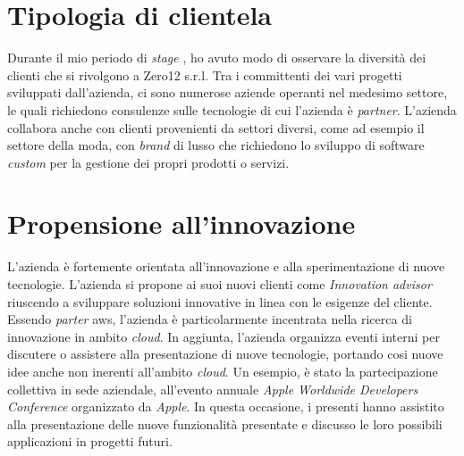 \section{Tipologia di clientela} \label{sec:clientela}
Durante il mio periodo di \textit{stage} , ho avuto modo di osservare la diversità dei clienti che si rivolgono a Zero12 s.r.l. Tra i committenti dei vari progetti sviluppati dall'azienda, ci sono numerose aziende operanti nel medesimo settore, le quali richiedono consulenze sulle tecnologie di cui l'azienda è \textit{partner}.
L'azienda collabora anche con clienti provenienti da settori diversi, come ad esempio il settore della moda, con \textit{brand} di lusso che richiedono lo sviluppo di software \textit{custom} per la gestione dei propri prodotti o servizi.

\section{Propensione all'innovazione}
L'azienda è fortemente orientata all'innovazione e alla sperimentazione di nuove tecnologie.
L'azienda si propone ai suoi nuovi clienti come \textit{Innovation advisor} riuscendo a sviluppare soluzioni innovative in linea con le esigenze del cliente. Essendo \textit{parter} \gls{aws}, l'azienda è particolarmente incentrata nella ricerca di innovazione in ambito \textit{cloud}.
In aggiunta, l'azienda organizza eventi interni per discutere o assistere alla presentazione di nuove tecnologie, portando cosi nuove idee anche non inerenti all'ambito \textit{cloud}. Un esempio, è stato la partecipazione collettiva in sede aziendale, all'evento annuale \textit{Apple Worldwide Developers Conference} organizzato da \textit{Apple}. In questa occasione, i presenti hanno assistito alla presentazione delle nuove funzionalità presentate e discusso le loro possibili applicazioni in progetti futuri.


    
    
